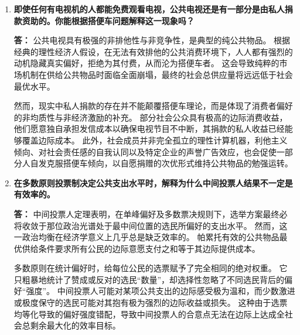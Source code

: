 \begin{enumerate}[label=\textbf{\arabic*.}, leftmargin=*]
		\textbf{答：} 该过度放牧的推断在微观经济学逻辑上完全成立。
		由于牧场属于公共财产，每个村民在决定增加羊群数量时，只会权衡个人的喂养收益与边际购买成本。
		他们绝不会主动考虑自己的放牧行为对草场植被造成的永久性破坏以及由此强加给全体村民的未来减产坏成本。
		这种私人成本与社会成本的系统性割裂，注定会引致草场的过度践踏与退化。
		
		村委会成员提出的两项政策建议均非常精准且切中时弊。
		课征年度许可证税本质上属于价格规制手段，它通过将许可证费用与放牧规模挂钩，强制将外部社会成本内生化为放牧者的私人边际成本。
		而将牧场直接确权并变卖给放牧者，则是通过科斯产权界定途径来化解危机。
		一旦公地转化为私人财产，所有者为了追求长期总财富的最大化，必然会主动限制当期的放牧头数，从而自发实现资源的跨期最优配置。
		\newpage
		\item \textbf{即使任何有电视机的人都能免费观看电视，公共电视还是有一部分是由私人捐款资助的。你能根据搭便车问题解释这一现象吗？}
		
		\textbf{答：} 公共电视具有极强的非排他性与非竞争性，是典型的纯公共物品。
		根据经典的理性经济人假设，在无法有效排他的公共消费环境下，人人都有强烈的动机隐藏真实偏好，拒绝为其付费，从而沦为搭便车者。
		这会导致纯粹的市场机制在供给公共物品时面临全面崩塌，最终的社会总供应量将远远低于社会最优水平。
		
		然而，现实中私人捐款的存在并不能颠覆搭便车理论，而是体现了消费者偏好的非均质性与非经济激励的补充。
		部分社会公众具有极高的边际消费收益，他们愿意独自承担发信成本以确保电视节目不中断，其捐款的私人收益已经能够覆盖边际成本。
		此外，社会成员并非完全孤立的理性计算机器，利他主义倾向、对社会责任感的自我认同以及特定企业的声誉广告效应，也会促使一部分人自发克服搭便车倾向，以自愿捐赠的次优形式维持公共物品的勉强运转。
		
		\item \textbf{在多数原则投票制决定公共支出水平时，解释为什么中间投票人结果不一定是有效率的。}
		
		\textbf{答：} 中间投票人定理表明，在单峰偏好及多数票决规则下，选举方案最终必将收敛于那位政治光谱处于最中间位置的选民所偏好的支出水平。
		然而，这一政治均衡在经济学意义上几乎总是缺乏效率的。
		帕累托有效的公共物品最优供给条件要求所有公民的边际意愿支付之和等于其边际提供成本。
		
		多数原则在统计偏好时，给每位公民的选票赋予了完全相同的绝对权重。
		它只粗暴地统计了赞成或反对的选民“数量”，却选择性忽略了不同选民背后的偏好“强度”。
		中间投票人可能对某项公共支出的边际感受极为温和，而少数激进或极度保守的选民可能对其抱有极为强烈的边际收益或损失。
		这种由于选票均等化导致的偏好强度错配，导致中间投票人的合意点无法在边际上达成全社会总剩余最大化的效率目标。
		

\end{enumerate}
